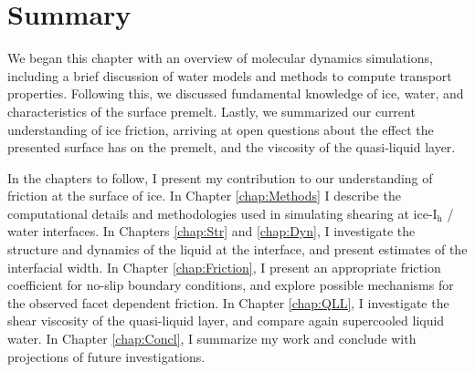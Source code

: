 

\section{Summary}
We began this chapter with an overview of molecular dynamics
simulations, including a brief discussion of water models and methods
to compute transport properties. Following this, we discussed
fundamental knowledge of ice, water, and characteristics of the
surface premelt. Lastly, we summarized our current
understanding of ice friction, arriving at open questions about the
effect the presented surface has on the premelt, and the
viscosity of the quasi-liquid layer.

In the chapters to follow, I present my contribution to our
understanding of friction at the surface of ice. In Chapter
\ref{chap:Methods} I describe the computational details and
methodologies used in simulating shearing at ice-I$_\mathrm{h}$ /
water interfaces. In Chapters \ref{chap:Str} and \ref{chap:Dyn}, I
investigate the structure and dynamics of the liquid at the interface,
and present estimates of the interfacial width. In Chapter
\ref{chap:Friction}, I present an appropriate friction coefficient for
no-slip boundary conditions, and explore possible mechanisms for the
observed facet dependent friction. In Chapter \ref{chap:QLL}, I
investigate the shear viscosity of the quasi-liquid layer, and compare
again supercooled liquid water. In Chapter \ref{chap:Concl}, I
summarize my work and conclude with projections of future
investigations.
